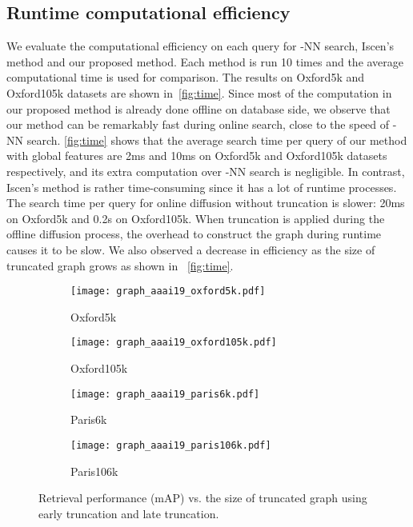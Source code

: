 \documentclass[letterpaper]{article} \usepackage{aaai19}  \usepackage{times}  \usepackage{helvet}  \usepackage{courier}  \usepackage{url}  \usepackage{graphicx}  \frenchspacing  \setlength{\pdfpagewidth}{8.5in}  \setlength{\pdfpageheight}{11in}
\begin{document}
\subsection{Runtime computational efficiency}

We evaluate the computational efficiency on each query for -NN search, Iscen's method and our proposed method.
Each method is run 10 times and the average computational time is used for comparison.
The results on Oxford5k and Oxford105k datasets are shown in~\cref{fig:time}.
Since most of the computation in our proposed method is already done offline on database side, we observe that our method can be remarkably fast during online search, close to the speed of -NN search.
\cref{fig:time} shows that the average search time per query of our method with global features are 2ms and 10ms on Oxford5k and Oxford105k datasets respectively, and its extra computation over -NN search is negligible.
In contrast, Iscen's method is rather time-consuming since it has a lot of runtime processes.
The search time per query for online diffusion without truncation is slower: 20ms on Oxford5k and 0.2s on Oxford105k.
When truncation is applied during the offline diffusion process, the overhead to construct the graph during runtime causes it to be slow. We also observed a decrease in efficiency as the size of truncated graph grows as shown in ~\cref{fig:time}.


\begin{figure*}[t!]
\centering
\begin{subfigure}[b]{0.24\linewidth}
  \texttt{[image: graph\_aaai19\_oxford5k.pdf]}
  \caption{Oxford5k}
\end{subfigure}
\begin{subfigure}[b]{0.24\linewidth}
  \texttt{[image: graph\_aaai19\_oxford105k.pdf]}
  \caption{Oxford105k}
\end{subfigure}
\begin{subfigure}[b]{0.24\linewidth}
  \texttt{[image: graph\_aaai19\_paris6k.pdf]}
  \caption{Paris6k}
\end{subfigure}
\begin{subfigure}[b]{0.24\linewidth}
  \texttt{[image: graph\_aaai19\_paris106k.pdf]}
  \caption{Paris106k}
\end{subfigure}
\caption{Retrieval performance (mAP) vs. the size of truncated graph  using early truncation and late truncation.}
\label{fig:subgraph_norm}
\vspace{-2mm}
\end{figure*}
\end{document}
